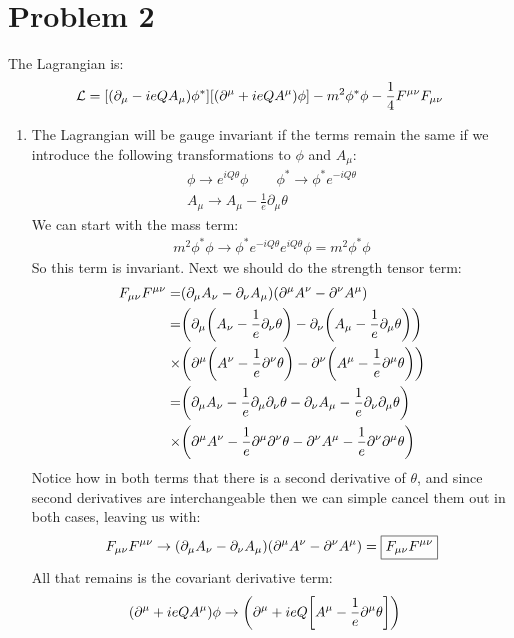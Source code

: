 \documentclass[12pt]{article}
\renewcommand{\L}{\mathcal{L}}
\newcommand{\D}{\partial}
\newcommand{\munu}{{\mu\nu}}
\begin{document}
\section*{Problem 2}
The Lagrangian is:
\begin{align*}
  \L=\qty[(\D_\mu-ieQA_\mu)\phi^*]\qty[(\D^\mu+ieQA^\mu)\phi]-m^2\phi^*\phi-\frac{1}{4}F^\munu F_\munu
\end{align*}
\begin{enumerate}[label=\alph*)]
\item The Lagrangian will be gauge invariant if the terms remain the same if we introduce the following transformations to $\phi$ and $A_\mu$:
  \begin{gather*}
    \phi\to e^{iQ\theta}\phi\qquad\phi^*\to \phi^*e^{-iQ\theta} \\
    A_\mu\to A_\mu-\frac{1}{e}\D_\mu\theta
  \end{gather*}
  We can start with the mass term:
  \begin{align*}
    m^2\phi^*\phi\to\phi^*e^{-iQ\theta}e^{iQ\theta}\phi=\boxed{m^2\phi^*\phi}
  \end{align*}
  So this term is invariant. Next we should do the strength tensor term:
  \begin{align*}
    F_{\mu\nu}F^{\mu\nu}=& (\D_\mu A_\nu-\D_\nu A_\mu)(\D^\mu A^\nu-\D^\nu A^\mu)\\
    =& \qty(\D_\mu\qty(A_\nu-\frac{1}{e}\D_\nu\theta)
    -\D_\nu\qty(A_\mu-\frac{1}{e}\D_\mu\theta))\\
    \times& \qty(\D^\mu\qty(A^\nu-\frac{1}{e}\D^\nu\theta)
    -\D^\nu\qty(A^\mu-\frac{1}{e}\D^\mu\theta))\\
    =& \qty(\D_\mu A_\nu-\frac{1}{e}\D_\mu\D_\nu\theta
    -\D_\nu A_\mu-\frac{1}{e}\D_\nu\D_\mu\theta)\\
    \times& \qty(\D^\mu A^\nu-\frac{1}{e}\D^\mu\D^\nu\theta
    -\D^\nu A^\mu-\frac{1}{e}\D^\nu\D^\mu\theta)
  \end{align*}
  Notice how in both terms that there is a second derivative of $\theta$, and since second derivatives are interchangeable then we can simple cancel them out in both cases, leaving us with:
  \begin{align*}
    F_{\mu\nu}F^{\mu\nu}\to\qty(\D_\mu A_\nu-\D_\nu A_\mu)
    \qty(\D^\mu A^\nu-\D^\nu A^\mu)=\boxed{F_{\mu\nu}F^{\mu\nu}}
  \end{align*}
  All that remains is the covariant derivative term:
  \begin{align*}
    (\D^\mu+ieQA^\mu)\phi&\to\qty(\D^\mu+ieQ\qty[A^\mu-\frac{1}{e}\D^\mu\theta])

\end{align*}
\end{enumerate}
\end{document}
